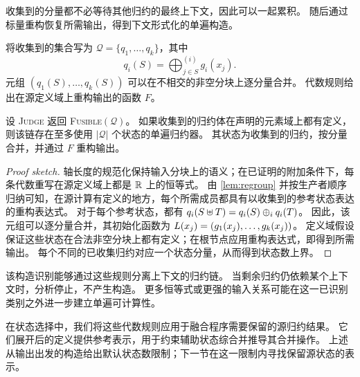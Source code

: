 收集到的分量都不必等待其他归约的最终上下文，因此可以一起累积。
随后通过标量重构恢复所需输出，得到下文形式化的单遍构造。

\finishwrapspace
\endgroup

将收集到的集合写为 $\mathcal Q=\{q_1,\dots,q_k\}$，其中
\[
q_i(S)=\bigoplus_{j\in S}^{(i)}g_i(x_j).
\]
元组 $(q_1(S),\dots,q_k(S))$ 可以在不相交的非空分块上逐分量合并。
代数规则给出在源定义域上重构输出的函数 $F$。

\begin{theorem}[Existence]
\label{thm:existence}
设 \textsc{Judge} 返回 \textsc{Fusible}$(\mathcal Q)$。
如果收集到的归约体在声明的元素域上都有定义，则该链存在至多使用 $|\mathcal Q|$ 个状态的单遍归约器。
其状态为收集到的归约，按分量合并，并通过 $F$ 重构输出。
\end{theorem}

\begin{proof}[Proof sketch]
轴长度的规范化保持输入分块上的语义；在已证明的附加条件下，每条代数重写在源定义域上都是 $\mathbb{R}$ 上的恒等式。
由 \cref{lem:regroup} 并按生产者顺序归纳可知，在源计算有定义的地方，每个所需成员都具有以收集到的参考状态表达的重构表达式。
对于每个参考状态，都有 $q_i(S\uplus T)=q_i(S)\oplus_i q_i(T)$。
因此，该元组可以逐分量合并，其初始化函数为 $L(x_j)=(g_1(x_j),\dots,g_k(x_j))$。
定义域假设保证这些状态在合法非空分块上都有定义；在根节点应用重构表达式，即得到所需输出。
每个不同的已收集归约对应一个状态分量，从而得到状态数上界。
\end{proof}

该构造识别能够通过这些规则分离上下文的归约链。
当剩余归约仍依赖某个上下文时，分析停止，不产生构造。
更多恒等式或更强的输入关系可能在这一已识别类别之外进一步建立单遍可计算性。

在状态选择中，我们将这些代数规则应用于融合程序需要保留的源归约结果。
它们展开后的定义提供参考表示，用于约束辅助状态综合并推导其合并操作。
上述从输出出发的构造给出默认状态数限制；下一节在这一限制内寻找保留源状态的表示。
